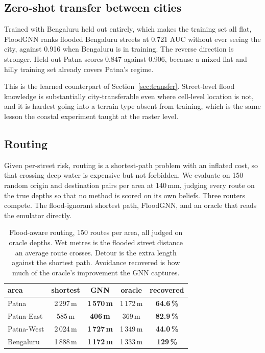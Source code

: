 \subsection{Zero-shot transfer between cities}
Trained with Bengaluru held out entirely, which makes the training set all flat, FloodGNN ranks
flooded Bengaluru streets at 0.721 AUC without ever seeing the city, against 0.916 when Bengaluru
is in training. The reverse direction is stronger. Held-out Patna scores 0.847 against 0.906,
because a mixed flat and hilly training set already covers Patna's regime.

This is the learned counterpart of Section~\ref{sec:transfer}. Street-level flood knowledge is
substantially city-transferable even where cell-level location is not, and it is hardest going into
a terrain type absent from training, which is the same lesson the coastal experiment taught at the
raster level.

\subsection{Routing}
Given per-street risk, routing is a shortest-path problem with an inflated cost, so that crossing
deep water is expensive but not forbidden. We evaluate on 150 random origin and destination pairs
per area at 140\,mm, judging every route on the true depths so that no method is scored on its own
beliefs. Three routers compete. The flood-ignorant shortest path, FloodGNN, and an oracle that
reads the emulator directly.

\begin{table}[!t]
\centering
\caption{Flood-aware routing, 150 routes per area, all judged on oracle depths. Wet metres is the
flooded street distance an average route crosses. Detour is the extra length against the shortest
path. Avoidance recovered is how much of the oracle's improvement the GNN captures.}
\label{tab:routing}
\begin{tabular}{lcccc}
\toprule
area & shortest & \textbf{GNN} & oracle & recovered \\
\midrule
Patna       & 2\,297\,m & \textbf{1\,570\,m} & 1\,172\,m & \textbf{64.6\,\%} \\
Patna-East  &    585\,m & \textbf{406\,m}    &    369\,m & \textbf{82.9\,\%} \\
Patna-West  & 2\,024\,m & \textbf{1\,727\,m} & 1\,349\,m & \textbf{44.0\,\%} \\
Bengaluru   & 1\,888\,m & \textbf{1\,172\,m} & 1\,333\,m & \textbf{129\,\%} \\
\bottomrule
\end{tabular}
\end{table}

